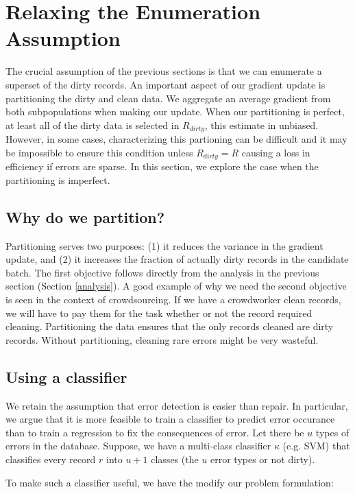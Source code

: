 \section{Relaxing the Enumeration Assumption}\label{imperfect}
The crucial assumption of the previous sections is that we can enumerate a superset of the dirty records.
An important aspect of our gradient update is partitioning the dirty and clean data.
We aggregate an average gradient from both subpopulations when making our update.
When our partitioning is perfect, at least all of the dirty data is selected in $R_{dirty}$, this estimate in unbiased.
However, in some cases, characterizing this partioning can be difficult and it may be impossible to ensure this condition unless $R_{dirty} = R$ causing a loss in efficiency if errors are sparse.  
In this section, we explore the case when the partitioning is imperfect.

\subsection{Why do we partition?}
Partitioning serves two purposes: (1) it reduces the variance in the gradient update, and (2) it increases the fraction of actually dirty records in the candidate batch.
The first objective follows directly from the analysis in the previous section (Section \ref{analysis}).
A good example of why we need the second objective is seen in the context of crowdsourcing.
If we have a crowdworker clean records, we will have to pay them for the task whether or not the record required cleaning.
Partitioning the data ensures that the only records cleaned are dirty records.
Without partitioning, cleaning rare errors might be very wasteful. 

\subsection{Using a classifier}
We retain the assumption that error detection is easier than repair.
In particular, we argue that it is more feasible to train a classifier to predict error occurance than to train a regression to fix the consequences of error.
Let there be $u$ types of errors in the database.
Suppose, we have a multi-class classifier $\kappa$ (e.g. SVM) that classifies every record $r$ into
$u+1$ classes (the $u$ error types or not dirty).

To make such a classifier useful, we have the modify our problem formulation:

\vspace{0.5em}

